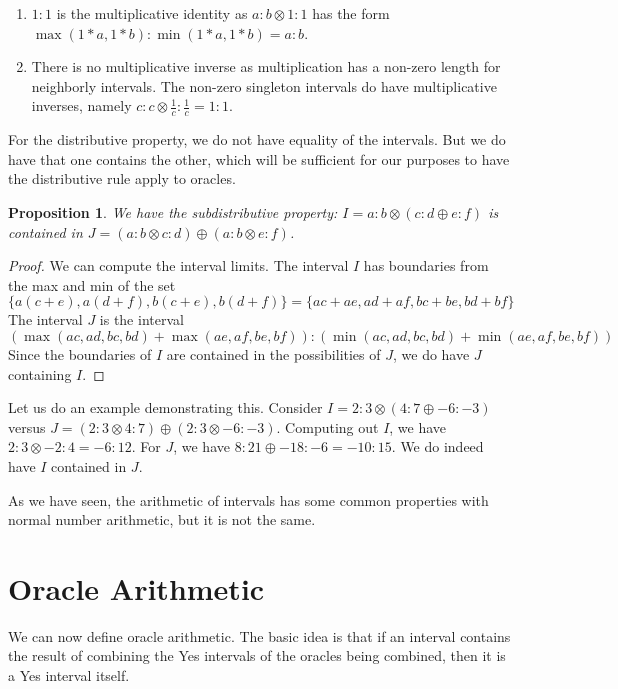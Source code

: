 \documentclass[12pt]{article}
\newtheorem{proposition}{Proposition}[subsection]
\theoremstyle{remark}
\begin{document}
\begin{enumerate}
    \item $1:1$ is the multiplicative identity as $a:b \otimes 1:1$ has the form $\max(1*a, 1*b):\min(1*a, 1*b) = a:b$. 
    \item There is no multiplicative inverse as multiplication has a non-zero length for neighborly intervals. The non-zero singleton intervals do have multiplicative inverses, namely $c:c  \otimes  \frac{1}{c} : \frac{1}{c} = 1:1$.
\end{enumerate}

For the distributive property, we do not have equality of the intervals. But we do have that one contains the other, which will be sufficient for our purposes to have the distributive rule apply to oracles. 

\begin{proposition}
We have the subdistributive property: $I = a:b\otimes(c:d \oplus e:f)$ is contained in $J = (a:b \otimes c:d) \oplus (a:b \otimes e:f)$. 
\end{proposition}

\begin{proof}
We can compute the interval limits. The interval $I$ has boundaries from the max and min of the set 
\[
\{a(c+e), a(d+f), b(c+e), b(d+f)\} = \{ac+ae, ad+af, bc+be, bd+bf\}
\] 
The interval $J$ is the interval 
\[
(\max(ac, ad, bc, bd) + \max(ae, af, be, bf) ) : (\min(ac, ad, bc, bd) + \min(ae, af, be, bf) )
\]
Since the boundaries of $I$ are contained in the possibilities of $J$, we do have $J$ containing $I$.
\end{proof}

Let us do an example demonstrating this. Consider $I = 2:3 \otimes ( 4:7 \oplus -6:-3)$ versus $J = (2:3 \otimes 4:7) \oplus (2:3 \otimes -6:-3)$. Computing out $I$, we have $2:3 \otimes -2:4 = -6:12$. For $J$, we have $8:21 \oplus -18:-6 = -10: 15$. We do indeed have $I$ contained in $J$.

As we have seen, the arithmetic of intervals has some common properties with normal number arithmetic, but it is not the same.

\section{Oracle Arithmetic}

We can now define oracle arithmetic. The basic idea is that if an interval contains the result of combining the Yes intervals of the oracles being combined, then it is a Yes interval itself. 
\end{document}
